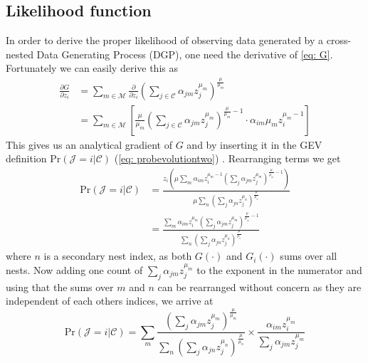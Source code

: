 \label{sec: Estimation}

\subsection{Likelihood function}
In order to derive the proper likelihood of observing data generated by a cross-nested Data Generating Process (DGP), one need the derivative of \eqref{eq: G}. Fortunately we can easily derive this as
\begin {equation} \label{eq: Gi}
\begin{split}
\frac{\partial G}{\partial z_i} &= \sum_{m\in\mathcal{M}} \frac{\partial}{\partial z_i}
\left(
 \sum_{j\in\mathcal{C}} \alpha_{jm} z_j^{\mu_m}
 \right)^{\frac{\mu}{\mu_m}} \\
&= \sum_{m\in\mathcal{M}} \left[\frac{\mu}{\mu_m} \left(
\sum_{j\in\mathcal{C}} \alpha_{jm} z_j^{\mu_m}
\right)^{\frac{\mu}{\mu_m}-1}
 \cdot
\alpha_{im}\mu_m z_i^{\mu_m -1} \right]
\end{split}
\end{equation}
This gives us an analytical gradient of $G$ and by inserting it in the GEV definition $\textrm{Pr}(\mathcal{J} = i | \mathcal{C})$ (\ref{eq: probevolutiontwo}) \citep{bierlaire_theoretical_2006}. Rearranging terms we get
\begin{equation} \label{eq: likelihoodderiv}
\begin{split}
\textrm{Pr}(\mathcal{J} = i | \mathcal{C}) &=
\frac{z_i \left(
\mu \sum_{m} \alpha_{im} z_i^{\mu_m - 1}\left( \sum_j \alpha_{jm} z_j^{\mu_m} \right)^{\frac{\mu}{\mu_m} -1}
\right)}{ \mu
\sum_n \left(
\sum_j \alpha_{jn} z_j^{\mu_n}
\right)^{\frac{\mu}{\mu_n}}
}
\\
& = \frac{
 \sum_{m} \alpha_{im} z_i^{\mu_m }\left( \sum_j \alpha_{jm} z_j^{\mu_m} \right)^{\frac{\mu}{\mu_m} -1}
}{
\sum_n \left(
\sum_j \alpha_{jn} z_j^{\mu_n}
\right)^{\frac{\mu}{\mu_n}}
}
\end{split}
\end{equation}
where $n$ is a secondary nest index, as both $G(\cdot)$ and $G_i(\cdot)$ sums over all nests. Now adding one count of $\sum_j \alpha_{jm} z_j^{\mu_m}$ to the exponent in the numerator and using that the sums over $m$ and $n$ can be rearranged without concern as they are independent of each others indices, we arrive at
\begin{equation} \label{eq: likelihoodprob}
\textrm{Pr}(\mathcal{J} = i | \mathcal{C})  =
\sum_m
\frac{\left(
 \sum_j \alpha_{jm} z_j^{\mu_m} \right)^{\frac{\mu}{\mu_m}}}{\sum_n \left(
  \sum_j \alpha_{jn} z_j^{\mu_n} \right)^{\frac{\mu}{\mu_n}}
} \times
\frac{\alpha_{im}z_i^{\mu_m}}{\sum_j \alpha_{jm} z_j^{\mu_m}}
\end{equation}
